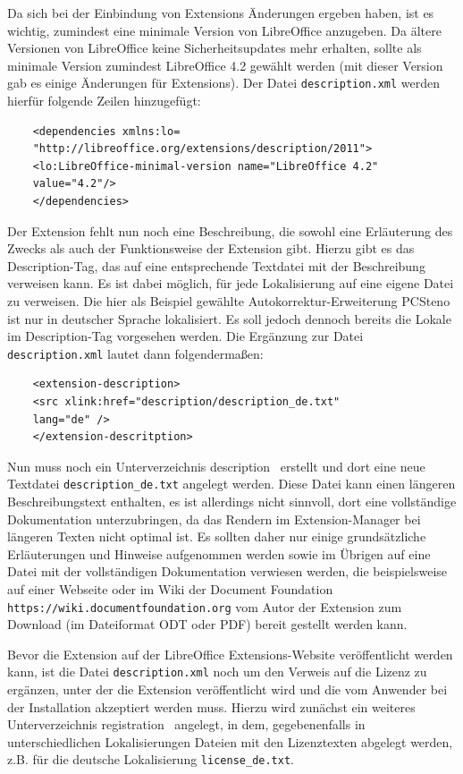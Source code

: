 \documentclass[12pt,a4paper,titlepage]{book}
\begin{document}
Da sich bei der Einbindung von Extensions Änderungen ergeben haben, ist es wichtig, zumindest eine minimale Version von LibreOffice anzugeben. Da ältere Versionen von LibreOffice keine Sicherheitsupdates mehr erhalten, sollte als minimale Version zumindest LibreOffice 4.2 gewählt werden (mit dieser Version gab es einige Änderungen für Extensions). Der Datei \verb|description.xml| werden hierfür folgende Zeilen hinzugefügt:
\begin{lstlisting}
	<dependencies xmlns:lo=
	"http://libreoffice.org/extensions/description/2011">
	<lo:LibreOffice-minimal-version name="LibreOffice 4.2" 
	value="4.2"/>
	</dependencies>
\end{lstlisting}

Der Extension fehlt nun noch eine Beschreibung, die sowohl eine Erläuterung des Zwecks als auch der Funktionsweise der Extension gibt. Hierzu gibt es das Description-Tag, das auf eine entsprechende Textdatei mit der Beschreibung verweisen kann. Es ist dabei möglich, für jede Lokalisierung auf eine eigene Datei zu verweisen. Die hier als Beispiel gewählte Autokorrektur-Erweiterung PCSteno ist nur in deutscher Sprache lokalisiert. Es soll jedoch dennoch bereits die Lokale im Description-Tag vorgesehen werden. Die Ergänzung zur Datei \verb|description.xml| lautet dann folgendermaßen:
\begin{lstlisting}
	<extension-description>
	<src xlink:href="description/description_de.txt" 
	lang="de" />
	</extension-descritption>
\end{lstlisting}

Nun muss noch ein Unterverzeichnis \glqq description\grqq~ erstellt und dort eine neue Textdatei \verb|description_de.txt| angelegt werden. Diese Datei kann einen längeren Beschreibungstext enthalten, es ist allerdings nicht sinnvoll, dort eine vollständige Dokumentation unterzubringen, da das Rendern im Extension-Manager bei längeren Texten nicht optimal ist. Es sollten daher nur einige grundsätzliche Erläuterungen und Hinweise aufgenommen werden sowie im Übrigen auf eine Datei mit der vollständigen Dokumentation verwiesen werden, die beispielsweise auf einer Webseite oder im Wiki der Document Foundation \verb|https://wiki.documentfoundation.org| vom Autor der Extension zum Download (im Dateiformat ODT oder PDF) bereit gestellt werden kann.

Bevor die Extension auf der LibreOffice Extensions-Website veröffentlicht werden kann, ist die Datei \verb|description.xml| noch um den Verweis auf die Lizenz zu ergänzen, unter der die Extension veröffentlicht wird und die vom Anwender bei der Installation akzeptiert werden muss. Hierzu wird zunächst ein weiteres Unterverzeichnis \glqq registration\grqq~ angelegt, in dem, gegebenenfalls in unterschiedlichen Lokalisierungen Dateien mit den Lizenztexten abgelegt werden, z.B. für die deutsche Lokalisierung \verb|license_de.txt|. 
\end{document}
